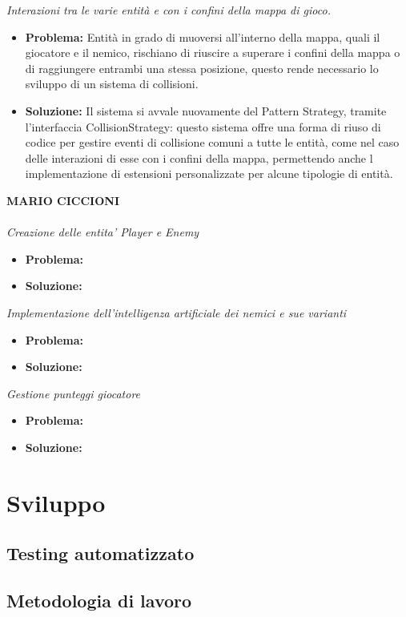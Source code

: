 \documentclass[a4paper,12pt]{report}
\begin{document}
\textit{Interazioni tra le varie entità e con i confini della mappa di gioco.}
\begin{itemize}
    \item \textbf{Problema:} Entità in grado di muoversi all’interno della mappa, quali il giocatore e il nemico, rischiano di riuscire a superare i confini della mappa o di raggiungere entrambi una stessa posizione, questo rende necessario lo sviluppo di un sistema di collisioni.
    \item \textbf{Soluzione:} Il sistema si avvale nuovamente del Pattern Strategy, tramite l’interfaccia CollisionStrategy:  questo sistema offre una forma di riuso di codice per gestire eventi di collisione comuni a tutte le entità, come nel caso delle interazioni di esse con i confini della mappa, permettendo anche l implementazione di estensioni personalizzate per alcune tipologie di entità.
\end{itemize}
\textbf{MARIO CICCIONI}
\\ \\
\textit{Creazione delle entita' Player e Enemy}
\begin{itemize}
    \item \textbf{Problema:} 
    \item \textbf{Soluzione:} 
\end{itemize}
\textit{Implementazione dell'intelligenza artificiale dei nemici e sue varianti}
\begin{itemize}
    \item \textbf{Problema:} 
    \item \textbf{Soluzione:} 
\end{itemize}
\textit{Gestione punteggi giocatore}
\begin{itemize}
    \item \textbf{Problema:} 
    \item \textbf{Soluzione:} 
\end{itemize}

\chapter{Sviluppo}
\section{Testing automatizzato}
\section{Metodologia di lavoro}
\end{document}
